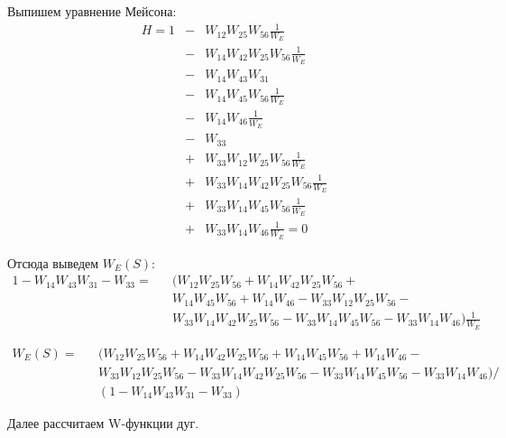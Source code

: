Выпишем уравнение Мейсона:
\begin{eqnarray*}
	H = 1
		& - & W_{12}W_{25}W_{56} \frac{1}{W_E} \\
		& - & W_{14}W_{42}W_{25}W_{56} \frac{1}{W_E} \\
		& - & W_{14}W_{43}W_{31} \\
		& - & W_{14}W_{45}W_{56} \frac{1}{W_E} \\
		& - & W_{14}W_{46} \frac{1}{W_E} \\
		& - & W_{33} \\
		& + & W_{33}W_{12}W_{25}W_{56} \frac{1}{W_E} \\
		& + & W_{33}W_{14}W_{42}W_{25}W_{56} \frac{1}{W_E} \\
		& + & W_{33}W_{14}W_{45}W_{56} \frac{1}{W_E} \\
		& + & W_{33}W_{14}W_{46} \frac{1}{W_E} = 0
\end{eqnarray*}

Отсюда выведем $W_E(S)$:
\begin{eqnarray*}
	1 - W_{14}W_{43}W_{31} - W_{33} = && (W_{12}W_{25}W_{56} + W_{14}W_{42}W_{25}W_{56} + \\
	&& W_{14}W_{45}W_{56} + W_{14}W_{46} - W_{33}W_{12}W_{25}W_{56} - \\
	&& W_{33}W_{14}W_{42}W_{25}W_{56} - W_{33}W_{14}W_{45}W_{56} - W_{33}W_{14}W_{46})\frac{1}{W_E}
\end{eqnarray*}

\begin{eqnarray*}
	W_E(S) = && (W_{12}W_{25}W_{56} + W_{14}W_{42}W_{25}W_{56} + W_{14}W_{45}W_{56} + W_{14}W_{46} - \\
	&&W_{33}W_{12}W_{25}W_{56} - W_{33}W_{14}W_{42}W_{25}W_{56} - W_{33}W_{14}W_{45}W_{56} - W_{33}W_{14}W_{46})/ \\
	&&(1 - W_{14}W_{43}W_{31} - W_{33})
\end{eqnarray*}

Далее рассчитаем W-функции дуг.

